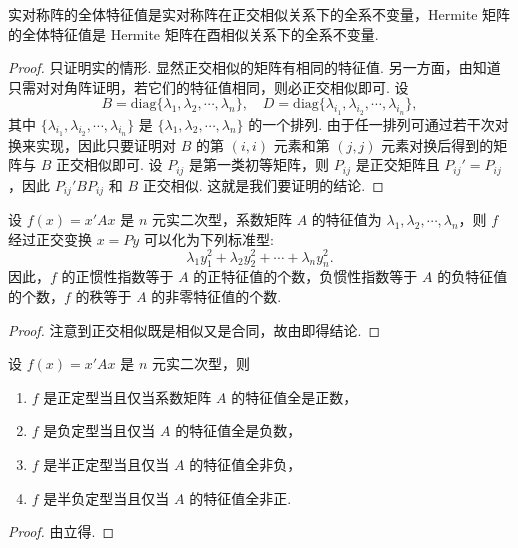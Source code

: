 \documentclass[../../main.tex]{subfiles}
\begin{document}
\begin{corollary}\label{corollary:实对称和Hermite矩阵的全系不变量}
实对称阵的全体特征值是实对称阵在正交相似关系下的全系不变量，Hermite 矩阵的全体特征值是 Hermite 矩阵在酉相似关系下的全系不变量.
\end{corollary}
\begin{proof}
只证明实的情形. 显然正交相似的矩阵有相同的特征值. 另一方面，由知道只需对对角阵证明，若它们的特征值相同，则必正交相似即可. 设
\[
B = \mathrm{diag}\{\lambda_1,\lambda_2,\cdots,\lambda_n\}, \quad D = \mathrm{diag}\{\lambda_{i_1},\lambda_{i_2},\cdots,\lambda_{i_n}\},
\]
其中 $\{\lambda_{i_1},\lambda_{i_2},\cdots,\lambda_{i_n}\}$ 是 $\{\lambda_1,\lambda_2,\cdots,\lambda_n\}$ 的一个排列. 由于任一排列可通过若干次对换来实现，因此只要证明对 $B$ 的第 $(i,i)$ 元素和第 $(j,j)$ 元素对换后得到的矩阵与 $B$ 正交相似即可. 设 $P_{ij}$ 是第一类初等矩阵，则 $P_{ij}$ 是正交矩阵且 $P_{ij}' = P_{ij}$，因此 $P_{ij}'BP_{ij}$ 和 $B$ 正交相似. 这就是我们要证明的结论.
\end{proof}

\begin{theorem}\label{theorem:二次型经正交变换后可化为标准型}
设 $f(x) = x'Ax$ 是 $n$ 元实二次型，系数矩阵 $A$ 的特征值为 $\lambda_1,\lambda_2,\cdots,\lambda_n$，则 $f$ 经过正交变换 $x = Py$ 可以化为下列标准型:
\[
\lambda_1y_1^2 + \lambda_2y_2^2 + \cdots + \lambda_ny_n^2.
\]
因此，$f$ 的正惯性指数等于 $A$ 的正特征值的个数，负惯性指数等于 $A$ 的负特征值的个数，$f$ 的秩等于 $A$ 的非零特征值的个数.
\end{theorem}
\begin{proof}
注意到正交相似既是相似又是合同，故由即得结论. 
\end{proof}

\begin{corollary}\label{corollary:二次型式(半)正定型(负定型)的充要条件}
设 $f(x) = x'Ax$ 是 $n$ 元实二次型，则 
\begin{enumerate}
\item $f$ 是正定型当且仅当系数矩阵 $A$ 的特征值全是正数，

\item $f$ 是负定型当且仅当 $A$ 的特征值全是负数，

\item $f$ 是半正定型当且仅当 $A$ 的特征值全非负，

\item $f$ 是半负定型当且仅当 $A$ 的特征值全非正.
\end{enumerate}
\end{corollary}
\begin{proof}
由立得.
\end{proof}
\end{document}
